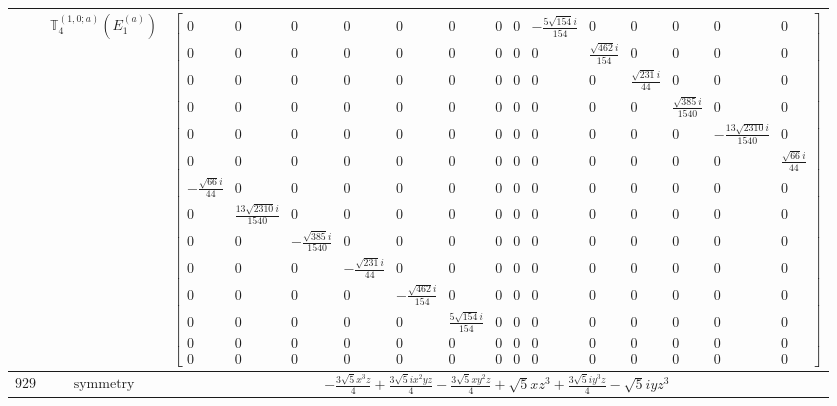 \documentclass[fleqn,8pt,landscape]{jsarticle}
\begin{document}
\begin{longtable}{ccc}
$  $ & $ \mathbb{T}_{4}^{(1,0;a)}(E_{1}^{(a)}) $ & $ \begin{bmatrix} 0 & 0 & 0 & 0 & 0 & 0 & 0 & 0 & - \frac{5 \sqrt{154} i}{154} & 0 & 0 & 0 & 0 & 0 \\ 0 & 0 & 0 & 0 & 0 & 0 & 0 & 0 & 0 & \frac{\sqrt{462} i}{154} & 0 & 0 & 0 & 0 \\ 0 & 0 & 0 & 0 & 0 & 0 & 0 & 0 & 0 & 0 & \frac{\sqrt{231} i}{44} & 0 & 0 & 0 \\ 0 & 0 & 0 & 0 & 0 & 0 & 0 & 0 & 0 & 0 & 0 & \frac{\sqrt{385} i}{1540} & 0 & 0 \\ 0 & 0 & 0 & 0 & 0 & 0 & 0 & 0 & 0 & 0 & 0 & 0 & - \frac{13 \sqrt{2310} i}{1540} & 0 \\ 0 & 0 & 0 & 0 & 0 & 0 & 0 & 0 & 0 & 0 & 0 & 0 & 0 & \frac{\sqrt{66} i}{44} \\ - \frac{\sqrt{66} i}{44} & 0 & 0 & 0 & 0 & 0 & 0 & 0 & 0 & 0 & 0 & 0 & 0 & 0 \\ 0 & \frac{13 \sqrt{2310} i}{1540} & 0 & 0 & 0 & 0 & 0 & 0 & 0 & 0 & 0 & 0 & 0 & 0 \\ 0 & 0 & - \frac{\sqrt{385} i}{1540} & 0 & 0 & 0 & 0 & 0 & 0 & 0 & 0 & 0 & 0 & 0 \\ 0 & 0 & 0 & - \frac{\sqrt{231} i}{44} & 0 & 0 & 0 & 0 & 0 & 0 & 0 & 0 & 0 & 0 \\ 0 & 0 & 0 & 0 & - \frac{\sqrt{462} i}{154} & 0 & 0 & 0 & 0 & 0 & 0 & 0 & 0 & 0 \\ 0 & 0 & 0 & 0 & 0 & \frac{5 \sqrt{154} i}{154} & 0 & 0 & 0 & 0 & 0 & 0 & 0 & 0 \\ 0 & 0 & 0 & 0 & 0 & 0 & 0 & 0 & 0 & 0 & 0 & 0 & 0 & 0 \\ 0 & 0 & 0 & 0 & 0 & 0 & 0 & 0 & 0 & 0 & 0 & 0 & 0 & 0 \end{bmatrix} $ \\ \hline
$ 929 $ & $ \text{symmetry} $ & $ - \frac{3 \sqrt{5} x^{3} z}{4} + \frac{3 \sqrt{5} i x^{2} y z}{4} - \frac{3 \sqrt{5} x y^{2} z}{4} + \sqrt{5} x z^{3} + \frac{3 \sqrt{5} i y^{3} z}{4} - \sqrt{5} i y z^{3} $ \\

\end{longtable}
\end{document}
